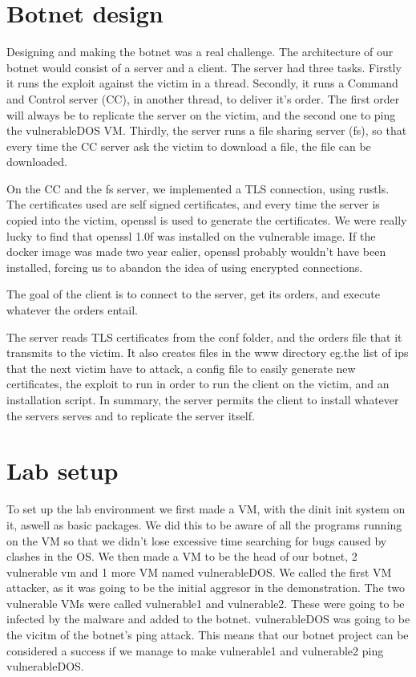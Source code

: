 \documentclass[../main.tex]{subfiles}
\begin{document}
    \vspace{10pt}

    \section{Botnet design}

    Designing and making the botnet was a real challenge. 
    The architecture of our botnet would consist of a server and a client. The server had three tasks. 
    Firstly it runs the exploit against the victim in a thread.
    Secondly, it runs a Command and Control server (CC), in another thread, to deliver it's order.
    The first order will always be to replicate the server on the victim, and the second one to ping the vulnerableDOS VM.
    Thirdly, the server runs a file sharing server (fs), so that every time the CC server ask the victim to download a file, the file can be downloaded.

    On the CC and the fs server, we implemented a TLS connection, using rustls. 
    The certificates used are self signed certificates, and every time the server is copied into the victim, openssl is used to generate the certificates.
    We were really lucky to find that openssl 1.0f was installed on the vulnerable image. 
    If the docker image was made two year ealier, openssl probably wouldn't have been installed, forcing us to abandon the idea of using encrypted connections.

    The goal of the client is to connect to the server, get its orders, and execute whatever the orders entail.

    The server reads TLS certificates from the conf folder, and the orders file that it transmits to the victim.
    It also creates files in the www directory eg.the list of ips that the next victim have to attack, a config file to easily generate new certificates, the exploit to run in order to run the client on the victim, and an installation script. In summary, the server permits the client to install whatever the servers serves and to replicate the server itself.

    \vspace{10pt}

    \section{Lab setup}

    To set up the lab environment we first made a VM, with the dinit init system on it, aswell as basic packages.
    We did this to be aware of all the programs running on the VM so that we didn't lose excessive time searching for bugs caused by clashes in the OS.
    We then made a VM to be the head of our botnet, 2 vulnerable vm and 1 more VM named vulnerableDOS.
    We called the first VM attacker, as it was going to be the initial aggresor in the demonstration.
    The two vulnerable VMs were called vulnerable1 and vulnerable2.
    These were going to be infected by the malware and added to the botnet.
    vulnerableDOS was going to be the vicitm of the botnet's ping attack.
    This means that our botnet project can be considered a success if we manage to make vulnerable1 and vulnerable2 ping vulnerableDOS.
\end{document}
